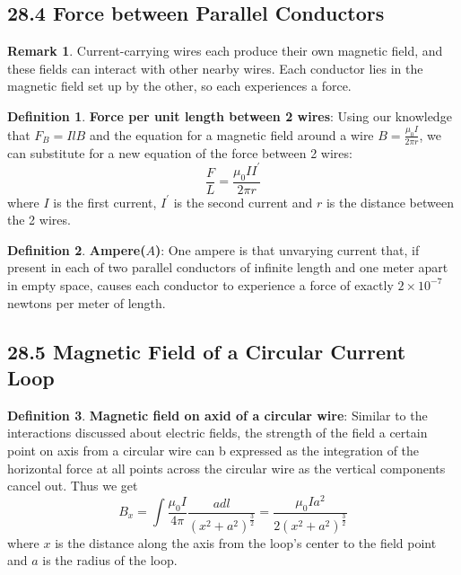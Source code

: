 \documentclass[12pt]{amsart}
\theoremstyle{definition}
\newtheorem{definition}{Definition} %
\newtheorem*{remark}{Remark}        %
\numberwithin{equation}{theorem}    %
\begin{document}
\subsection*{28.4 Force between Parallel Conductors}

\begin{remark}
    Current-carrying wires each produce their own magnetic field, and these fields can interact with other nearby wires. Each conductor lies in the magnetic field set up by the other, so each experiences a force.
\end{remark}

\begin{definition}
    \textbf{Force per unit length between 2 wires}:
    Using our knowledge that $F_B = IlB$ and the equation for a magnetic field around a wire $B = \frac{\mu_0I}{2\pi r}$, we can substitute for a new equation of the force between 2 wires: 
    $$\frac{F}{L} = \frac{\mu_0 I I^{'}}{2\pi r}$$
    where $I$ is the first current, $I^{'}$ is the second current and $r$ is the distance between the 2 wires.
\end{definition}


\begin{definition}
    \textbf{Ampere($A$)}:
    One ampere is that unvarying current that, if present in each of two parallel conductors of infinite length and one meter apart in empty space, causes each conductor to experience a force of exactly $2\times 10^{-7}$ newtons per meter of length.
\end{definition}

\subsection*{28.5 Magnetic Field of a Circular Current Loop}

\begin{definition}
    \textbf{Magnetic field on axid of a circular wire}:
    Similar to the interactions discussed about electric fields, the strength of the field a certain point on axis from a circular wire can b expressed as the integration of the horizontal force at all points across the circular wire as the vertical components cancel out. Thus we get $$B_x = \int \frac{\mu_0I}{4\pi}\frac{adl}{(x^2+a^2)^{\frac{3}{2}}} =\frac{\mu_0Ia^2}{2(x^2+a^2)^{\frac{3}{2}}}$$
    where $x$ is the distance along the axis from the loop's center to the field point and $a$ is the radius of the loop.
\end{definition}
\end{document}
